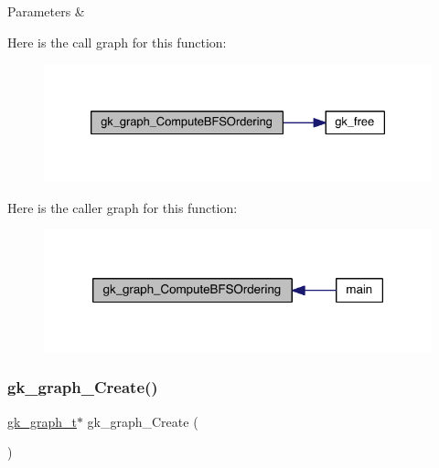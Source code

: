 \begin{DoxyParams}{Parameters}
{\em } & \\
\hline
\end{DoxyParams}
Here is the call graph for this function\+:\nopagebreak
\begin{figure}[H]
\begin{center}
\leavevmode
\includegraphics[width=330pt]{a00077_afc3115833e0ad293dbe9fd4028b12f20_cgraph}
\end{center}
\end{figure}
Here is the caller graph for this function\+:\nopagebreak
\begin{figure}[H]
\begin{center}
\leavevmode
\includegraphics[width=318pt]{a00077_afc3115833e0ad293dbe9fd4028b12f20_icgraph}
\end{center}
\end{figure}
\mbox{\label{a00077_a0d092a371d797437de53ae1a64bd78f4}} 
\subsubsection{\texorpdfstring{gk\+\_\+graph\+\_\+\+Create()}{gk\_graph\_Create()}}
{\footnotesize\ttfamily \hyperlink{a00638}{gk\+\_\+graph\+\_\+t}$\ast$ gk\+\_\+graph\+\_\+\+Create (\begin{DoxyParamCaption}{ }\end{DoxyParamCaption})}

